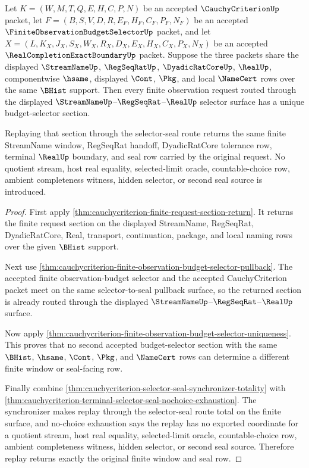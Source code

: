 
\begin{theorem}
\label{thm:cauchycriterion-budget-selector-section-exactness}
Let $K=(W,M,T,Q,E,H,C,P,N)$ be an accepted $\CauchyCriterionUp$ packet, let
$F=(B,S,V,D,R,E_F,H_F,C_F,P_F,N_F)$ be an accepted
$\FiniteObservationBudgetSelectorUp$ packet, and let
$X=(L,K_X,J_X,S_X,W_X,R_X,D_X,E_X,H_X,C_X,P_X,N_X)$ be an accepted
$\RealCompletionExactBoundaryUp$ packet. Suppose the three packets share the
displayed $\StreamNameUp$, $\RegSeqRatUp$, $\DyadicRatCoreUp$, $\RealUp$,
componentwise $\hsame$, displayed $\Cont$, $\Pkg$, and local $\NameCert$ rows
over the same $\BHist$ support. Then every finite observation request routed
through the displayed $\StreamNameUp$--$\RegSeqRat$--$\RealUp$ selector surface
has a unique budget-selector section.

Replaying that section through the selector-seal route returns the same finite
StreamName window, RegSeqRat handoff, DyadicRatCore tolerance row, terminal
$\RealUp$ boundary, and seal row carried by the original request. No quotient
stream, host real equality, selected-limit oracle, countable-choice row,
ambient completeness witness, hidden selector, or second seal source is
introduced.
\end{theorem}
\begin{proof}
First apply \autoref{thm:cauchycriterion-finite-request-section-return}. It
returns the finite request section on the displayed StreamName, RegSeqRat,
DyadicRatCore, Real, transport, continuation, package, and local naming rows
over the given $\BHist$ support.

Next use
\autoref{thm:cauchycriterion-finite-observation-budget-selector-pullback}. The
accepted finite observation-budget selector and the accepted CauchyCriterion
packet meet on the same selector-to-seal pullback surface, so the returned
section is already routed through the displayed $\StreamNameUp$--$\RegSeqRat$--$\RealUp$
surface.

Now apply
\autoref{thm:cauchycriterion-finite-observation-budget-selector-uniqueness}.
This proves that no second accepted budget-selector section with the same
$\BHist$, $\hsame$, $\Cont$, $\Pkg$, and $\NameCert$ rows can determine a
different finite window or seal-facing row.

Finally combine
\autoref{thm:cauchycriterion-selector-seal-synchronizer-totality} with
\autoref{thm:cauchycriterion-terminal-selector-seal-nochoice-exhaustion}. The
synchronizer makes replay through the selector-seal route total on the finite
surface, and no-choice exhaustion says the replay has no exported coordinate
for a quotient stream, host real equality, selected-limit oracle,
countable-choice row, ambient completeness witness, hidden selector, or second
seal source. Therefore replay returns exactly the original finite window and
seal row.
\end{proof}

